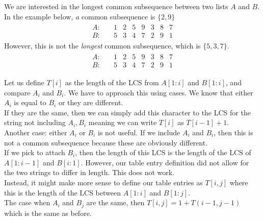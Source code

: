 \documentclass[14pt]{extarticle}
\begin{document}
    We are interested in the longest common subsequence between two lists $A$
    and $B$. In the example below, \textit{a} common subsequence is $\{2, 9\}$
    \begin{align*}
        \begin{matrix}
            A:\quad & 1 & \boxed{2} & 5 & \boxed{9} & 3 & 8 & 7         \\
            B:\quad & 5 & 3 & 4 & 7 & \boxed{2} & \boxed{9} & 1         
        \end{matrix}
    \end{align*}
    However, this is not the \textit{longest} common subsequence, which is
    $\{5, 3, 7\}$.
    \begin{align*}
        \begin{matrix}
            A:\quad & 1 & 2 & \boxed{5} & 9 & \boxed{3} & 8 & \boxed{7} \\
            B:\quad & \boxed{5} & \boxed{3} & 4 & \boxed{7} & 2 & 9 & 1         
        \end{matrix}
    \end{align*}

    Let us define $T[i]$ as the length of the LCS from $A[1:i]$ and $B[1:i]$,
    and compare $A_i$ and $B_i$. We have to approach this using cases. We know
    that either $A_i$ is equal to $B_i$ or they are different.\\

    If they are the same, then we can simply add this character to the LCS
    for the string not including $A_i, B_i$ meaning we can write $T[i]$
    as $T[i-1] + 1$.\\

    Another case: either $A_i$ or $B_i$ is not useful. If we include $A_i$
    and $B_i$, then this is not a common subsequence because these are
    obviously different.\\

    If we pick to attach $B_i$, then the length of this LCS is the length of
    the LCS of $A[1:i-1]$ and $B[i:1]$. However, our table entry definition
    did not allow for the two strings to differ in length. This does not work.
    \\

    Instead, it might make more sense to define our table entries as $T[i, j]$
    where this is the length of the LCS between $A[1:i]$ and $B[1:j]$.\\

    The case when $A_i$ and $B_j$ are the same, then $T[i, j] = 1 + T(i - 1,
    j - 1)$ which is the same as before.
    \pagebreak
\end{document}
